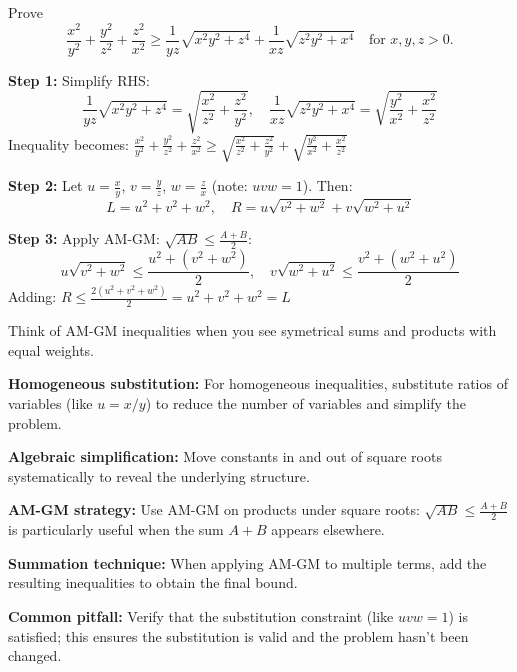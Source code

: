 \begin{problem}
Prove
\[
\frac{x^2}{y^2} + \frac{y^2}{z^2} + \frac{z^2}{x^2} \geq \frac{1}{yz}\sqrt{x^2y^2 + z^4} + \frac{1}{xz}\sqrt{z^2y^2 + x^4} \quad \text{for } x, y, z > 0.
\]
\end{problem}

\begin{solution}
\textbf{Step 1:} Simplify RHS:
\[
\frac{1}{yz}\sqrt{x^2y^2 + z^4} = \sqrt{\frac{x^2}{z^2} + \frac{z^2}{y^2}}, \quad \frac{1}{xz}\sqrt{z^2y^2 + x^4} = \sqrt{\frac{y^2}{x^2} + \frac{x^2}{z^2}}
\]
Inequality becomes: $\frac{x^2}{y^2} + \frac{y^2}{z^2} + \frac{z^2}{x^2} \geq \sqrt{\frac{x^2}{z^2} + \frac{z^2}{y^2}} + \sqrt{\frac{y^2}{x^2} + \frac{x^2}{z^2}}$

\textbf{Step 2:} Let $u = \frac{x}{y}$, $v = \frac{y}{z}$, $w = \frac{z}{x}$ (note: $uvw = 1$). Then:
\[
L = u^2 + v^2 + w^2, \quad R = u\sqrt{v^2 + w^2} + v\sqrt{w^2 + u^2}
\]

\textbf{Step 3:} Apply AM-GM: $\sqrt{AB} \leq \frac{A+B}{2}$:
\[
u\sqrt{v^2 + w^2} \leq \frac{u^2 + (v^2 + w^2)}{2}, \quad v\sqrt{w^2 + u^2} \leq \frac{v^2 + (w^2 + u^2)}{2}
\]
Adding: $R \leq \frac{2(u^2 + v^2 + w^2)}{2} = u^2 + v^2 + w^2 = L$
\end{solution}

\begin{takeaways}
    \item Think of AM-GM inequalities when you see symetrical sums and products with equal weights.
    \item \textbf{Homogeneous substitution:} For homogeneous inequalities, substitute ratios of variables (like $u = x/y$) to reduce the number of variables and simplify the problem.
    \item \textbf{Algebraic simplification:} Move constants in and out of square roots systematically to reveal the underlying structure.
    \item \textbf{AM-GM strategy:} Use AM-GM on products under square roots: $\sqrt{AB} \leq \frac{A+B}{2}$ is particularly useful when the sum $A+B$ appears elsewhere.
    \item \textbf{Summation technique:} When applying AM-GM to multiple terms, add the resulting inequalities to obtain the final bound.
    \item \textbf{Common pitfall:} Verify that the substitution constraint (like $uvw = 1$) is satisfied; this ensures the substitution is valid and the problem hasn't been changed.

\end{takeaways}

